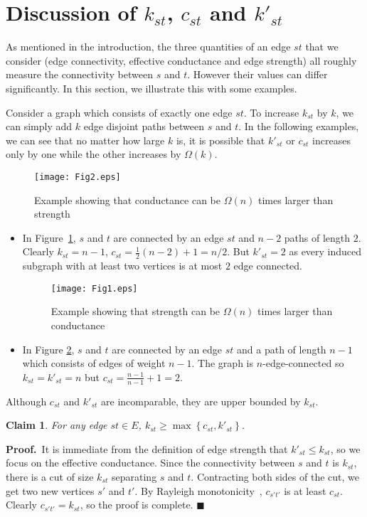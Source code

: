 \documentclass[11pt]{article}
\newcommand{\proofbelow}{8pt}
\numberwithin{equation}{section}
\newtheorem{claim}[theorem]{Claim}
\renewenvironment{proof}{\noindent\textbf{Proof.}\,}{\afterproof}
\newcommand{\afterproof}{\hfill $\blacksquare$ \par \vspace{\proofbelow}}
\newcommand{\set}[1]{\left \{ #1 \right \}}                     \newcommand{\setst}[2]{\left\{\; #1 \,:\, #2 \;\right\}}
\newcommand{\AppendixName}[1]{\label{app:#1}}
\newcommand{\ClaimName}[1]{\label{clm:#1}}
\newcommand{\FigureName}[1]{\label{fig:#1}}
\newcommand{\Figure}[1]{Figure~\ref{fig:#1}}
\begin{document}
\section{Discussion of $k_{st}$, $c_{st}$ and $k'_{st}$}
\AppendixName{gapexample}

As mentioned in the introduction,
the three quantities of an edge $st$ that we consider
(edge connectivity, effective conductance and edge strength)
all roughly measure the connectivity between $s$ and $t$.
However their values can differ significantly.
In this section, we illustrate this with some examples.

Consider a graph which consists of exactly one edge $st$.
To increase $k_{st}$ by $k$,
we can simply add $k$ edge disjoint paths between $s$ and $t$.
In the following examples, we can see that no matter how large $k$ is,
it is possible that $k'_{st}$ or $c_{st}$ increases only by one
while the other increases by $\Omega(k)$.

\begin{figure}
	\centering
    \texttt{[image: Fig2.eps]}
	\caption{Example showing that conductance can be $\Omega(n)$ times larger than strength}
	\FigureName{example1}
\end{figure}

\begin{itemize}
\item
In \Figure{example1},
$s$ and $t$ are connected by an edge $st$
and $n-2$ paths of length $2$.
Clearly $k_{st}=n-1$, 
$c_{st}=\frac{1}{2}(n-2)+1=n/2$.
But $k'_{st}=2$ as every induced subgraph with at least two vertices is at most $2$ edge connected.

\begin{figure}
	\centering
    \texttt{[image: Fig1.eps]}
	\caption{Example showing that strength can be $\Omega(n)$ times larger than conductance}
	\label{example2}
\end{figure}

\item
In Figure \ref{example2},
$s$ and $t$ are connected by an edge $st$
and a path of length $n-1$
which consists of edges of weight $n-1$.
The graph is $n$-edge-connected so
$k_{st}=k'_{st}=n$ but $c_{st}=\frac{n-1}{n-1}+1=2$.
\end{itemize}

Although $c_{st}$ and $k'_{st}$ are incomparable, they are upper bounded by $k_{st}$.

\begin{claim}
\ClaimName{ck}
For any edge $st\in E$, $k_{st} \geq \max \set{ c_{st}, k'_{st} }$.
\end{claim}
\begin{proof}
It is immediate from the definition of edge strength that $k'_{st} \leq k_{st}$,
so we focus on the effective conductance.
Since the connectivity between $s$ and $t$ is $k_{st}$,
there is a cut of size $k_{st}$ separating $s$ and $t$.
Contracting both sides of the cut, 
we get two new vertices $s'$ and $t'$.
By Rayleigh monotonicity~\cite{DoyleSnell}, $c_{s't'}$ is at least $c_{st}$.
Clearly $c_{s't'} = k_{st}$, so the proof is complete.
\end{proof}
\end{document}
